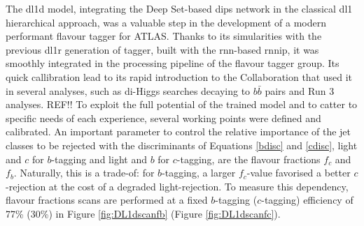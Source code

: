 The \gls{dl1d} model, integrating the Deep Set-based \gls{dips} network in the classical \gls{dl1} hierarchical approach, was a valuable step in the development of a modern performant flavour tagger for ATLAS. Thanks to its simularities with the previous \gls{dl1r} generation of tagger, built with the \gls{rnn}-based \gls{rnnip}, it was smoothly integrated in the processing pipeline of the flavour tagger group. Its quick callibration lead to its rapid introduction to the Collaboration that used it in several analyses, such as di-Higgs searches decaying to $b\bar{b}$ pairs and Run 3 analyses. REF!! To exploit the full potential of the trained model and to catter to specific needs of each experience, several working points were defined and calibrated. An important parameter to control the relative importance of the jet classes to be rejected with the discriminants of Equations \ref{bdisc} and \ref{cdisc}, light and $c$ for $b$-tagging and light and $b$ for $c$-tagging, are the flavour fractions $f_c$ and $f_b$. Naturally, this is a trade-of: for $b$-tagging, a larger $f_c$-value favorised a better $c$-rejection at the cost of a degraded light-rejection. To measure this dependency, flavour fractions scans are performed at a fixed $b$-tagging ($c$-tagging) efficiency of 77\% (30\%) in Figure \ref{fig:DL1dscanfb} (Figure \ref{fig:DL1dscanfc}). 

